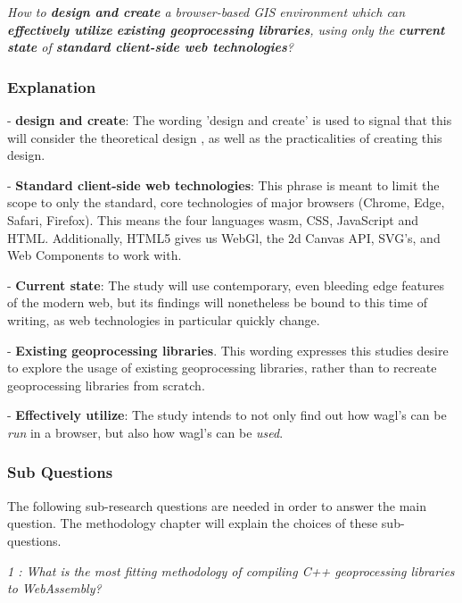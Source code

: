 \textit{How to \textbf{design and create} a browser-based GIS environment which can \textbf{effectively utilize} \textbf{existing geoprocessing libraries}, using only the \textbf{current state} of \textbf{standard client-side web technologies}?}

\subsubsection*{Explanation}


- \textbf{design and create}: The wording 'design and create' is used to signal that this will consider the theoretical design , as well as the practicalities of creating this design. 

- \textbf{Standard client-side web technologies}: This phrase is meant to limit the scope to only the standard, core technologies of major browsers (Chrome, Edge, Safari, Firefox). This means the four languages \ac{wasm}, CSS, JavaScript and HTML. Additionally, HTML5 gives us WebGl, the 2d Canvas API, SVG's, and Web Components to work with.

- \textbf{Current state}: The study will use contemporary, even bleeding edge features of the modern web, but its findings will nonetheless be bound to this time of writing, as web technologies in particular quickly change. 

- \textbf{Existing geoprocessing libraries}. This wording expresses this studies desire to explore the usage of existing geoprocessing libraries, rather than to recreate geoprocessing libraries from scratch.

- \textbf{Effectively utilize}: The study intends to not only find out how \ac{wagl}'s can be \textit{run} in a browser, but also how \ac{wagl}'s can be \textit{used}. 


\subsubsection*{Sub Questions}

The following sub-research questions are needed in order to answer the main question. The methodology chapter will explain the choices of these sub-questions. 

\textit{1 : What is the most fitting methodology of compiling C++ geoprocessing libraries to WebAssembly?}

